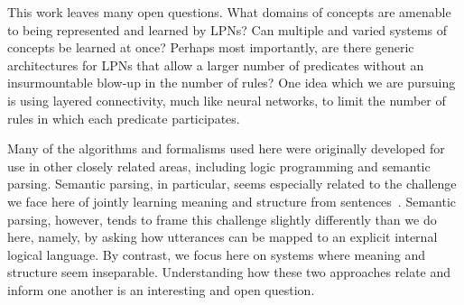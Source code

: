 \documentclass[10pt, twocolumn]{article}
\begin{document}
This work leaves many open questions. What domains of concepts are
amenable to being represented and learned by LPNs? Can multiple and
varied systems of concepts be learned at once? Perhaps most
importantly, are there generic architectures for LPNs that allow a
larger number of predicates without an insurmountable blow-up in the
number of rules? One idea which we are pursuing is using layered
connectivity, much like neural networks, to limit the number of rules
in which each predicate participates. 

Many of the algorithms and formalisms used here were originally
developed for use in other closely related areas, including logic
programming and semantic parsing. Semantic parsing, in particular,
seems especially related to the challenge we face here of jointly
learning meaning and structure from
sentences~\cite{berant2013semantic, liang2013learning, kwiatkowski2010inducing, poon2009unsupervised}. Semantic parsing,
however, tends to frame this challenge slightly differently than we do
here, namely, by asking how utterances can be mapped to an explicit
internal logical language. By contrast, we focus here on systems where
meaning and structure seem inseparable. Understanding how these two
approaches relate and inform one another is an interesting and open
question.




\end{document}
